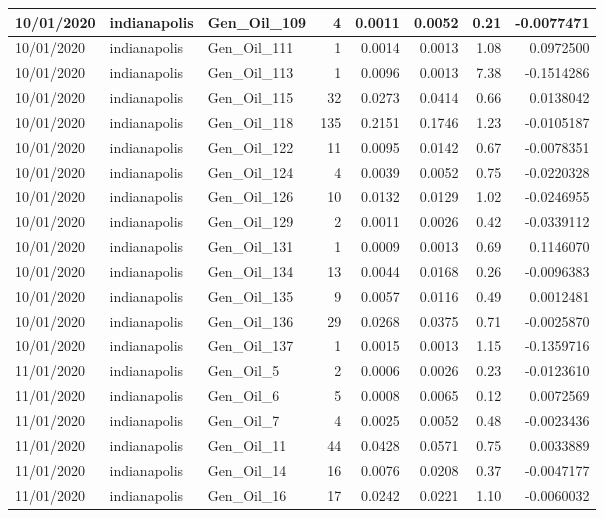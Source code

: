 \documentclass[
  letterpaper,
  DIV=11,
  numbers=noendperiod]{scrartcl}
\begin{document}
\begin{tabular}{l|l|l|r|r|r|r|r}
\hline
10/01/2020 & indianapolis & Gen\_Oil\_109 & 4 & 0.0011 & 0.0052 & 0.21 & -0.0077471\\
\hline
10/01/2020 & indianapolis & Gen\_Oil\_111 & 1 & 0.0014 & 0.0013 & 1.08 & 0.0972500\\
\hline
10/01/2020 & indianapolis & Gen\_Oil\_113 & 1 & 0.0096 & 0.0013 & 7.38 & -0.1514286\\
\hline
10/01/2020 & indianapolis & Gen\_Oil\_115 & 32 & 0.0273 & 0.0414 & 0.66 & 0.0138042\\
\hline
10/01/2020 & indianapolis & Gen\_Oil\_118 & 135 & 0.2151 & 0.1746 & 1.23 & -0.0105187\\
\hline
10/01/2020 & indianapolis & Gen\_Oil\_122 & 11 & 0.0095 & 0.0142 & 0.67 & -0.0078351\\
\hline
10/01/2020 & indianapolis & Gen\_Oil\_124 & 4 & 0.0039 & 0.0052 & 0.75 & -0.0220328\\
\hline
10/01/2020 & indianapolis & Gen\_Oil\_126 & 10 & 0.0132 & 0.0129 & 1.02 & -0.0246955\\
\hline
10/01/2020 & indianapolis & Gen\_Oil\_129 & 2 & 0.0011 & 0.0026 & 0.42 & -0.0339112\\
\hline
10/01/2020 & indianapolis & Gen\_Oil\_131 & 1 & 0.0009 & 0.0013 & 0.69 & 0.1146070\\
\hline
10/01/2020 & indianapolis & Gen\_Oil\_134 & 13 & 0.0044 & 0.0168 & 0.26 & -0.0096383\\
\hline
10/01/2020 & indianapolis & Gen\_Oil\_135 & 9 & 0.0057 & 0.0116 & 0.49 & 0.0012481\\
\hline
10/01/2020 & indianapolis & Gen\_Oil\_136 & 29 & 0.0268 & 0.0375 & 0.71 & -0.0025870\\
\hline
10/01/2020 & indianapolis & Gen\_Oil\_137 & 1 & 0.0015 & 0.0013 & 1.15 & -0.1359716\\
\hline
11/01/2020 & indianapolis & Gen\_Oil\_5 & 2 & 0.0006 & 0.0026 & 0.23 & -0.0123610\\
\hline
11/01/2020 & indianapolis & Gen\_Oil\_6 & 5 & 0.0008 & 0.0065 & 0.12 & 0.0072569\\
\hline
11/01/2020 & indianapolis & Gen\_Oil\_7 & 4 & 0.0025 & 0.0052 & 0.48 & -0.0023436\\
\hline
11/01/2020 & indianapolis & Gen\_Oil\_11 & 44 & 0.0428 & 0.0571 & 0.75 & 0.0033889\\
\hline
11/01/2020 & indianapolis & Gen\_Oil\_14 & 16 & 0.0076 & 0.0208 & 0.37 & -0.0047177\\
\hline
11/01/2020 & indianapolis & Gen\_Oil\_16 & 17 & 0.0242 & 0.0221 & 1.10 & -0.0060032\\

\end{tabular}
\end{document}
